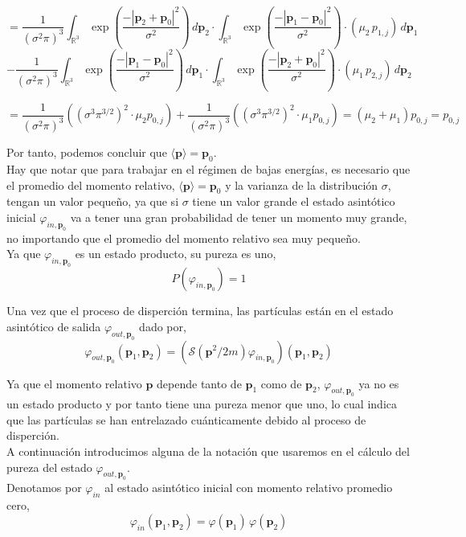\documentclass[12pt]{book}
\numberwithin{equation}{chapter}
\def\n{\noindent}
\def\R{\mathbb{R}}
\def\vp{\varphi}
\def\P{\mathbf{p}}
\begin{document}
$$= \frac{1}{( \sigma^{2} \pi )^{3}} \int_{\R^{3}}
\exp \left( \frac{-| \P_{2}+\P_{0} |^{2}}{\sigma^{2}} \right) \, d\P_{2}
\cdot \int_{\R^{3}} \exp \left( \frac{-| \P_{1}-\P_{0} |^{2}}{\sigma^{2}} \right) \cdot (\mu_{2} \, p_{1, j}) \, d\P_{1}  $$
$$- \frac{1}{( \sigma^{2} \pi )^{3}} \int_{\R^{3}}
\exp \left( \frac{-| \P_{1}-\P_{0} |^{2}}{\sigma^{2}} \right) \, d\P_{1}
\cdot \int_{\R^{3}} \exp \left( \frac{-| \P_{2}+\P_{0} |^{2}}{\sigma^{2}} \right) \cdot (\mu_{1} \, p_{2, j}) \, d\P_{2} $$

$$= \frac{1}{( \sigma^{2} \pi )^{3}} ( ( \sigma^{3}\pi^{3/2} )^{2} \cdot \mu_{2}p_{0,j} ) +   \frac{1}{( \sigma^{2} \pi )^{3}} ( ( \sigma^{3}\pi^{3/2} )^{2} \cdot \mu_{1}p_{0,j} ) = ( \mu_{2}+\mu_{1} ) p_{0,j}= p_{0,j} $$

Por tanto, podemos concluir que $\langle \P \rangle= \P_{0}$.\\

Hay que notar que para trabajar en el r\'egimen de bajas energ\'ias, es necesario que el promedio del momento relativo, $\langle \P \rangle= \P_{0}$ y la varianza de la distribuci\'on $\sigma$, tengan un valor peque\~no, ya que si $\sigma$ tiene un valor grande el estado asint\'otico inicial $ \vp_{in,\P_{0} } $ va a tener una gran probabilidad de tener un momento muy grande, no importando que el promedio del momento relativo sea muy peque\~no.\\

Ya que $\vp_{in,\P_{0}}$ es un estado producto, su pureza es uno,
\begin{equation}\label{p:estin}
P ( \vp_{in,\P_{0}} )= 1
\end{equation}

Una vez que el proceso de disperci\'on termina, las part\'iculas est\'an en el estado asint\'otico de salida $\vp_{out,\P_{0}}$ dado por,
\begin{equation}\label{estout}
\vp_{out,\P_{0}}(\P_{1},\P_{2})= ( \mathcal{S}(\P^{2}/2m) \vp_{in,\P_{0}} ) (\P_{1},\P_{2})
\end{equation}

Ya que el momento relativo $\P$ depende tanto de $\P_{1}$ como de $\P_{2}$, $\vp_{out,\P_{0}}$ ya no es un estado producto y por tanto tiene una pureza menor que uno, lo cual indica que las part\'iculas se han entrelazado cu\'anticamente debido al proceso de disperci\'on.\\

A continuaci\'on introducimos alguna de la notaci\'on que usaremos en el c\'alculo del pureza del estado $\vp_{out,\P_{0}}$.\\ 
\n Denotamos por $\vp_{in}$ al estado asint\'otico inicial con momento relativo promedio cero,
\begin{equation}\label{estinp0}
\vp_{in}(\P_{1},\P_{2})= \vp(\P_{1})\,\vp(\P_{2})
\end{equation}
\end{document}
